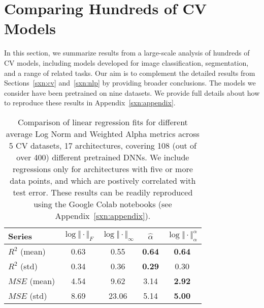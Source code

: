 \vspace{-1mm}
\section{Comparing Hundreds of CV Models}
\label{sxn:all_cv_models}

In this section, we summarize results from a large-scale analysis of hundreds of CV models, including models developed for image 
classification, segmentation, and a range of related tasks.  
Our aim is to complement the detailed results from Sections~\ref{sxn:cv} and~\ref{sxn:nlp} by providing broader conclusions. %
The models we consider have been pretrained on nine datasets.   %
We provide full details about how to reproduce these results in Appendix~\ref{sxn:appendix}.

\begin{table}[t]
\small
\begin{center}
\begin{tabular}{|p{0.75in}|c|c|c|c|}
\hline
Series        & $\log\Vert\cdot\Vert_{F}$ & $\log\Vert\cdot\Vert_{\infty}$ & $\hat{\alpha}$ & $\log\Vert\cdot\Vert^{\alpha}_{\alpha}$ \\
\hline
$R^{2}$ (mean) & 0.63 &  0.55 & \textbf{0.64} & \textbf{0.64} \\
$R^{2}$ (std)  & 0.34 &  0.36 & \textbf{0.29} &          0.30 \\
\hline
$MSE$ (mean)   & 4.54 &  9.62 &          3.14 & \textbf{2.92} \\
$MSE$ (std)    & 8.69 & 23.06 &          5.14 & \textbf{5.00} \\
\hline
\end{tabular}
\end{center}
\caption{Comparison of linear regression fits for different average Log Norm and Weighted Alpha metrics across 5 CV datasets, 17 architectures, covering 108 (out of over 400) different pretrained DNNs.  
         We include regressions only for architectures with five or more data points, and which are postively correlated with test error.
         These results can be readily reproduced using the Google Colab notebooks (see Appendix~\ref{sxn:appendix}). 
        }
\label{table:results}
\end{table}


